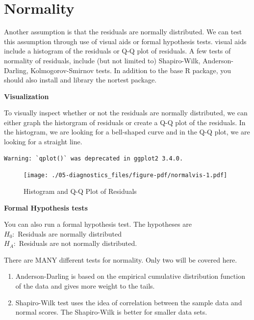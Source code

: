 \documentclass[
  letterpaper,
  DIV=11,
  numbers=noendperiod]{scrreprt}
\providecommand{\tightlist}{%
  \setlength{\itemsep}{0pt}\setlength{\parskip}{0pt}}\usepackage{longtable,booktabs,array}
\begin{document}
\hypertarget{normality}{%
\section{Normality}\label{normality}}

Another assumption is that the residuals are normally distributed. We
can test this assumption through use of visual aids or formal hypothesis
tests. visual aids include a histogram of the residuals or Q-Q plot of
residuals. A few tests of normality of residuals, include (but not
limited to) Shapiro-Wilk, Anderson-Darling, Kolmogorov-Smirnov tests. In
addition to the base R package, you should also install and library the
nortest package.

\textbf{Visualization}

To visually inspect whether or not the residuals are normally
distributed, we can either graph the historgram of residuals or create a
Q-Q plot of the residuals. In the histogram, we are looking for a
bell-shaped curve and in the Q-Q plot, we are looking for a straight
line.

\begin{verbatim}
Warning: `qplot()` was deprecated in ggplot2 3.4.0.
\end{verbatim}

\begin{figure}

{\centering \texttt{[image: ./05-diagnostics\_files/figure-pdf/normalvis-1.pdf]}

}

\caption{Histogram and Q-Q Plot of Residuals}

\end{figure}

\textbf{Formal Hypothesis tests}

You can also run a formal hypothesis test. The hypotheses are\\
\(H_{0}:\) Residuals are normally distributed\\
\(H_{A}:\) Residuals are not normally distributed.

There are MANY different tests for normality. Only two will be covered
here.

\begin{enumerate}
\def\labelenumi{\arabic{enumi}.}
\tightlist
\item
  Anderson-Darling is based on the empirical cumulative distribution
  function of the data and gives more weight to the tails.\\
\item
  Shapiro-Wilk test uses the idea of correlation between the sample data
  and normal scores. The Shapiro-Wilk is better for smaller data sets.
\end{enumerate}
\end{document}
